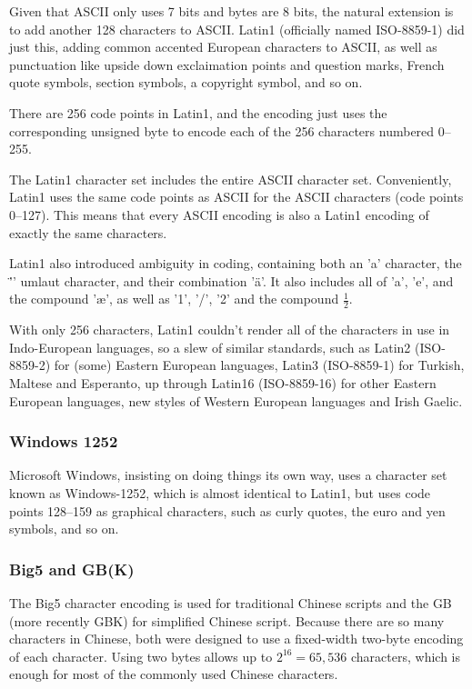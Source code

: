 Given that ASCII only uses 7 bits and bytes are 8 bits, the natural
extension is to add another 128 characters to ASCII.  Latin1
(officially named ISO-8859-1) did just this, adding common accented
European characters to ASCII, as well as punctuation like upside down
exclaimation points and question marks, French quote symbols, section
symbols, a copyright symbol, and so on.  

There are 256 code points in Latin1, and the encoding just uses the
corresponding unsigned byte to encode each of the 256 characters
numbered 0--255.

The Latin1 character set includes the entire ASCII character set.
Conveniently, Latin1 uses the same code points as ASCII for the ASCII
characters (code points 0--127).  This means that every ASCII encoding
is also a Latin1 encoding of exactly the same characters.

Latin1 also introduced ambiguity in coding, containing both an 'a'
character, the '\"{}' umlaut character, and their combination '\"{a}'.
It also includes all of 'a', 'e', and the compound '\ae', as well as
'1', '/', '2' and the compound $\frac{1}{2}$.

With only 256 characters, Latin1 couldn't render all of the characters
in use in Indo-European languages, so a slew of similar standards,
such as Latin2 (ISO-8859-2) for (some) Eastern European languages,
Latin3 (ISO-8859-1) for Turkish, Maltese and Esperanto, up through
Latin16 (ISO-8859-16) for other Eastern European languages, new styles
of Western European languages and Irish Gaelic.  

\subsubsection{Windows 1252}

Microsoft Windows, insisting on doing things its own way, uses a
character set known as Windows-1252, which is almost identical to Latin1,
but uses code points 128--159 as graphical characters, such as curly
quotes, the euro and yen symbols, and so on.

\subsubsection{Big5 and GB(K)}

The Big5 character encoding is used for traditional Chinese scripts
and the GB (more recently GBK) for simplified Chinese script.  Because
there are so many characters in Chinese, both were designed to use a
fixed-width two-byte encoding of each character.  Using two bytes
allows up to $2^{16} = 65,536$ characters, which is enough for most
of the commonly used Chinese characters.

